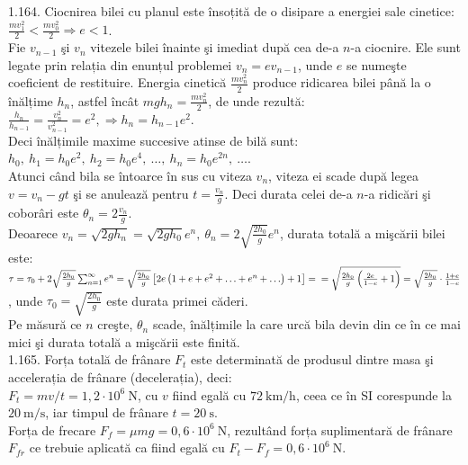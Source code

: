 1.164. Ciocnirea bilei cu planul este însoțită de o disipare a energiei sale cinetice:\\ $\frac{m v_{1}^{2}}{2}<\frac{m v_{0}^{2}}{2} \Rightarrow e<1$.\\ Fie $v_{n-1}$ şi $v_{n}$ vitezele bilei înainte şi imediat după cea de-a $n$-a ciocnire. Ele sunt legate prin relația din enunțul problemei $v_{n}=e v_{n-1}$, unde $e$ se numeşte coeficient de restituire. Energia cinetică $\frac{m v_{n}^{2}}{2}$ produce ridicarea bilei până la o înălțime $h_{n}$, astfel încât $m g h_{n}=\frac{m v_{n}^{2}}{2}$, de unde rezultă:\\ $\frac{h_{n}}{h_{n-1}}=\frac{v_{n}^{2}}{v_{n-1}^{2}}=e^{2}, \Rightarrow h_{n}=h_{n-1} e^{2}$.\\ Deci înălțimile maxime succesive atinse de bilă sunt:\\ $h_{0},\ h_{1}=h_{0} e^{2},\ h_{2}=h_{0} e^{4},\ \ldots,\ h_{n}=h_{0} e^{2 n},\ \ldots$.\\ Atunci când bila se întoarce în sus cu viteza $v_{n}$, viteza ei scade după legea $v=v_{n}-g t$ şi se anulează pentru $t=\frac{v_{n}}{g}$. Deci durata celei de-a $n$-a ridicări şi coborâri este $\theta_{n}=2 \frac{v_{n}}{g}$.\\ Deoarece $v_{n}=\sqrt{2 g h_{n}}=\sqrt{2 g h_{0}} e^{n},\ \theta_{n}=2 \sqrt{\frac{2 h_{0}}{g}} e^{n}$, durata totală a mişcării bilei este:\\ $\tau=\tau_{0}+2 \sqrt{\frac{2 h_{0}}{g}} \sum_{n=1}^{\infty} e^{n}=\sqrt{\frac{2 h_{0}}{g}}\left[2 e\left(1+e+e^{2}+\ldots+e^{n}+\ldots\right)+1\right]=\\ =\sqrt{\frac{2 h_{0}}{g}\left(\frac{2 e}{1-e}+1\right)}=\sqrt{\frac{2 h_{0}}{g}} \cdot \frac{1+e}{1-e}$, unde $\tau_{0}=\sqrt{\frac{2 h_{0}}{g}}$ este durata primei căderi.\\ Pe măsură ce $n$ creşte, $\theta_{n}$ scade, înălțimile la care urcă bila devin din ce în ce mai mici şi durata totală a mişcării este finită.\\

1.165. Forța totală de frânare $F_{t}$ este determinată de produsul dintre masa şi accelerația de frânare (decelerația), deci:\\ $F_{t}=m v / t=1,2 \cdot 10^{6} \mathrm{~N}$, cu $v$ fiind egală cu $72 \mathrm{~km} / \mathrm{h}$, ceea ce în SI corespunde la $20 \mathrm{~m} / \mathrm{s}$, iar timpul de frânare $t=20 \mathrm{~s}$.\\ Forța de frecare $F_{f}=\mu m g=0,6 \cdot 10^{6} \mathrm{~N}$, rezultând forța suplimentară de frânare $F_{f r}$ ce trebuie aplicată ca fiind egală cu $F_{t}-F_{f}=0,6 \cdot 10^{6} \mathrm{~N}$.\\

